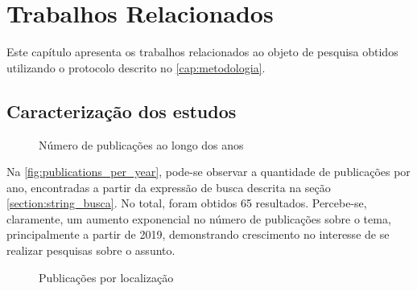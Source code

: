 \chapter{Trabalhos Relacionados}
\label{cap:trabalhos}
Este capítulo apresenta os trabalhos relacionados ao objeto de pesquisa obtidos utilizando o protocolo descrito no \autoref{cap:metodologia}.

\section{Caracterização dos estudos}

\begin{figure}
\centering
\caption{Número de publicações ao longo dos anos}
\label{fig:publications_per_year}
\end{figure}

Na \autoref{fig:publications_per_year}, pode-se observar a quantidade de publicações por ano, encontradas a partir da expressão de busca descrita na seção \ref{section:string_busca}. No total, foram obtidos 65 resultados. Percebe-se, claramente, um aumento exponencial no número de publicações sobre o tema, principalmente a partir de 2019, demonstrando crescimento no interesse de se realizar pesquisas sobre o assunto.

\begin{figure}
    \centering
    \caption{Publicações por localização}
    \datatable

    \label{fig:publications_per_territory}
\end{figure}

